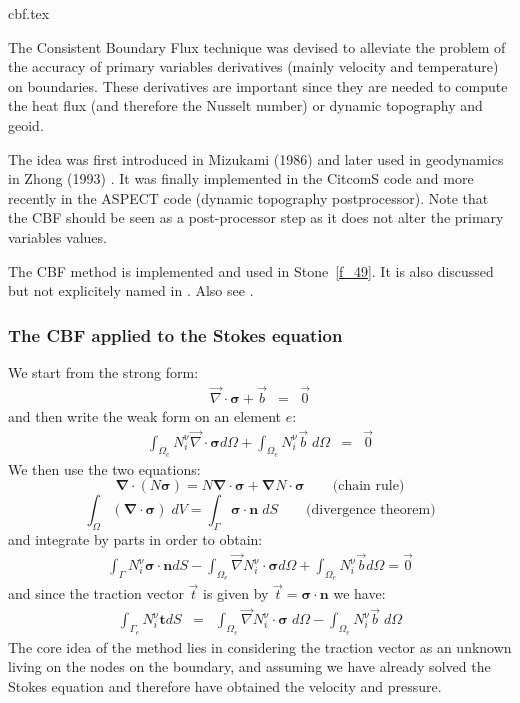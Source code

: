 \begin{flushright} {\tiny {\color{gray} cbf.tex}} \end{flushright}

The Consistent Boundary Flux technique was devised to 
alleviate the problem of the accuracy of primary variables 
derivatives (mainly velocity and temperature) on boundaries.
These derivatives are important since they are needed to compute
the heat flux (and therefore the Nusselt number) or 
dynamic topography and geoid. 

The idea was first introduced in Mizukami (1986) \cite{mizu86} and later used 
in geodynamics in Zhong \etal (1993) \cite{zhgh93}. It was finally implemented 
in the CitcomS code \cite{zhmt08,mole97} and more recently
in the ASPECT code (dynamic topography postprocessor).
Note that the CBF should be seen as a post-processor step 
as it does not alter the primary variables values.

The CBF method is implemented and used in Stone~\ref{f_49}.
It is also discussed but not explicitely named in \cite[p309]{reddybook2}.
Also see \cite{lahe76,grls87,mahz78}.

\subsubsection{The CBF applied to the Stokes equation}
We start from the strong form:
\begin{eqnarray}
{\vec \nabla}\cdot {\bm \sigma} + {\vec b} &=& {\vec 0} 
\end{eqnarray}
and then write the weak form on an element $e$:
\begin{eqnarray}
\int_{\Omega_e} N_i^\upnu {\vec \nabla}\cdot {\bm \sigma} d\Omega + \int_{\Omega_e} N_i^\upnu  {\vec b} \; d\Omega 
&=& \vec 0 
\end{eqnarray}
We then use the two equations: 
\[
\bm \nabla \cdot ( N  \bm \sigma ) = N \bm \nabla \cdot \bm \sigma + \bm \nabla N \cdot  \bm \sigma  
\qquad \text{(chain rule)}
\]
\[
\int_\Omega (\bm \nabla \cdot {\bm \sigma} )\; dV = \int_\Gamma {\bm \sigma} \cdot \bm n \; dS
\qquad \text{(divergence theorem)}
\]
and integrate by parts in order to obtain:
\begin{eqnarray}
\int_\Gamma N_i^\upnu {\bm \sigma}\cdot{\bm n} dS - 
\int_{\Omega_e} {\vec \nabla } N_i^\upnu \cdot {\bm \sigma} d\Omega + \int_{\Omega_e} N_i^\upnu  {\vec b} d\Omega =\vec{0}
\end{eqnarray}
and since the traction vector ${\vec t}$ is given by $\vec{t}={\bm \sigma}\cdot{\bm n}$ we have:
\begin{eqnarray}
\int_{\Gamma_e}  N_i^\upnu {\bm t} dS 
&=& \int_{\Omega_e} {\vec \nabla } N_i^\upnu \cdot {\bm \sigma}\; d\Omega 
- \int_{\Omega_e} N_i^\upnu  {\vec b} \; d\Omega   \label{eq:cbf1}
\end{eqnarray}
The core idea of the method lies in considering the traction vector as an unknown 
living on the nodes on the boundary, and assuming we have already solved the Stokes 
equation and therefore have obtained the velocity and pressure.

